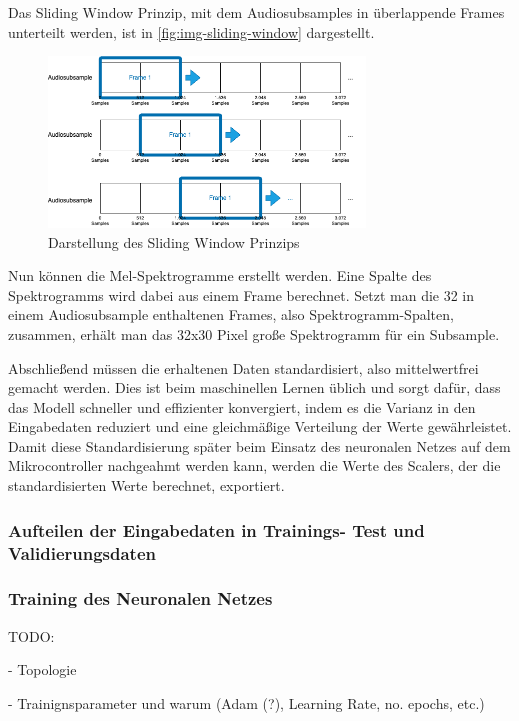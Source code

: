 Das Sliding Window Prinzip, mit dem Audiosubsamples in überlappende Frames unterteilt werden, ist in \autoref{fig:img-sliding-window} dargestellt.

\begin{figure}[h!]
\centering
\includegraphics[width=0.75\textwidth]{images/08_durchfuehrung/sliding_window.png}
\caption{Darstellung des Sliding Window Prinzips}
\label{fig:img-sliding-window}
\end{figure}

Nun können die Mel-Spektrogramme erstellt werden. Eine Spalte des Spektrogramms wird dabei aus einem Frame berechnet. Setzt man die 32 in einem Audiosubsample enthaltenen Frames, also Spektrogramm-Spalten, zusammen, erhält man das 32x30 Pixel große Spektrogramm für ein Subsample.

Abschließend müssen die erhaltenen Daten standardisiert, also mittelwertfrei gemacht werden. Dies ist beim maschinellen Lernen üblich und sorgt dafür, dass das Modell schneller und effizienter konvergiert, indem es die Varianz in den Eingabedaten reduziert und eine gleichmäßige Verteilung der Werte gewährleistet. Damit diese Standardisierung später beim Einsatz des neuronalen Netzes auf dem Mikrocontroller nachgeahmt werden kann, werden die Werte des Scalers, der die standardisierten Werte berechnet, exportiert.


\subsubsection{Aufteilen der Eingabedaten in Trainings- Test und Validierungsdaten}

\subsubsection{Training des Neuronalen Netzes}

TODO:

- Topologie

- Trainignsparameter und warum (Adam (?), Learning Rate, no. epochs, etc.)

